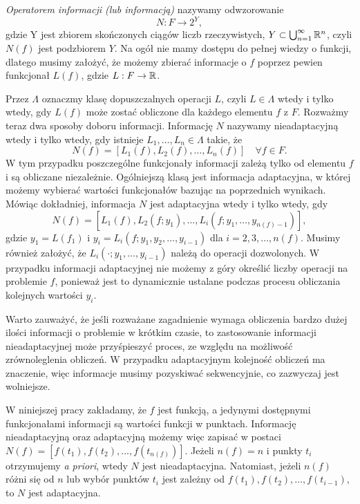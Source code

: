\documentclass[oik, pdftex, man]{mgrwms}
\begin{document}
    \textit{Operatorem informacji (lub informacją)} nazywamy odwzorowanie
    \begin{equation*}
        N : F \rightarrow 2^{Y},
    \end{equation*}
    gdzie Y jest zbiorem skończonych ciągów liczb rzeczywistych, $ Y \subset \bigcup^{\infty}_{n=1} \mathbb{R}^{n}$, czyli $N(f)$ jest podzbiorem $Y$.
    Na ogół nie mamy dostępu do pełnej wiedzy o funkcji, dlatego musimy założyć, że możemy zbierać informacje o $f$ poprzez pewien funkcjonał $L(f)$, gdzie $L : F \rightarrow \mathbb{R}$.
    
    Przez $\Lambda$ oznaczmy klasę dopuszczalnych operacji $L$, czyli $L \in \Lambda$ wtedy i tylko wtedy, gdy $L(f)$ może zostać obliczone dla każdego elementu $f$ z $F$. Rozważmy teraz dwa sposoby doboru informacji. Informację $N$ nazywamy nieadaptacyjną wtedy i tylko wtedy, gdy istnieje $L_{1}, \ldots, L_{n} \in \Lambda$ takie, że
    \begin{equation*}
        N(f) = \left[ L_{1}(f), L_{2}(f), \ldots, L_{n}(f) \right] \quad \forall f \in F.
    \end{equation*}
    W tym przypadku poszczególne funkcjonały informacji zależą tylko od elementu $f$ i są obliczane niezależnie.
    Ogólniejszą klasą jest informacja adaptacyjna, w której możemy wybierać wartości funkcjonałów bazując na poprzednich wynikach. Mówiąc dokładniej, informacja $N$ jest adaptacyjna wtedy i tylko wtedy, gdy
    \begin{equation*}
        N(f) = \left[ L_{1}(f), L_{2}(f; y_{1}), \ldots, L_{i}(f; y_{1}, \ldots, y_{n(f)-1}) \right],
    \end{equation*}
    gdzie $y_{1} = L(f_{1})$ i $y_{i} = L_{i}(f; y_{1}, y_{2}, \ldots, y_{i-1})$ dla $i=2,3,\ldots,n(f)$. Musimy również założyć, że $L_{i}(\cdot;y_{1}, \ldots, y_{i-1})$ należą do operacji dozwolonych. W przypadku informacji adaptacyjnej nie możemy z góry określić liczby operacji na problemie $f$, ponieważ jest to dynamicznie ustalane podczas procesu obliczania kolejnych wartości $y_{i}$.

    Warto zauważyć, że jeśli rozważane zagadnienie wymaga obliczenia bardzo dużej ilości informacji o problemie w krótkim czasie, to zastosowanie informacji nieadaptacyjnej może przyśpieszyć proces, ze względu na możliwość zrównoleglenia obliczeń. W przypadku adaptacyjnym kolejność obliczeń ma znaczenie, więc informacje musimy pozyskiwać sekwencyjnie, co zazwyczaj jest wolniejsze.

    W niniejszej pracy zakładamy, że $f$ jest funkcją, a jedynymi dostępnymi funkcjonałami informacji są wartości funkcji w punktach. Informację nieadaptacyjną oraz adaptacyjną możemy więc zapisać w postaci $N(f) = \left[ f(t_{1}), f(t_{2}), \ldots, f(t_{n(f)}) \right]$. Jeżeli $n(f) = n$ i punkty $t_{i}$ otrzymujemy \textit{a priori}, wtedy $N$ jest nieadaptacyjna. Natomiast, jeżeli $n(f)$ różni się od $n$ lub wybór punktów $t_{i}$ jest zależny od $f(t_{1}), f(t_{2}), \ldots, f(t_{i-1})$, to $N$ jest adaptacyjna.
\end{document}

